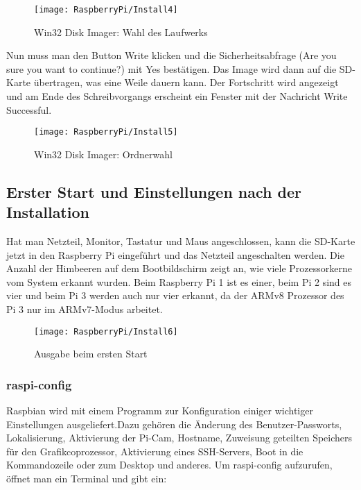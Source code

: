 \begin{figure}[!h]
	\centering
	
	\texttt{[image: RaspberryPi/Install4]}
	
	\caption{Win32 Disk Imager: Wahl des Laufwerks}
	
\end{figure}

Nun muss man den Button Write klicken und die Sicherheitsabfrage (Are you sure you want to continue?) mit Yes bestätigen. Das Image wird dann auf die SD-Karte übertragen, was eine Weile dauern kann. Der Fortschritt wird angezeigt und am Ende des Schreibvorgangs erscheint ein Fenster mit der Nachricht Write Successful.

\begin{figure}[!h]
	\centering
	
	\texttt{[image: RaspberryPi/Install5]}
	
	\caption{Win32 Disk Imager: Ordnerwahl}
	
\end{figure}

\subsection{Erster Start und Einstellungen nach der Installation}


Hat man Netzteil, Monitor, Tastatur und Maus angeschlossen, kann die SD-Karte jetzt in den Raspberry Pi eingeführt und das Netzteil angeschalten werden. Die Anzahl der Himbeeren auf dem Bootbildschirm zeigt an, wie viele Prozessorkerne vom System erkannt wurden. Beim Raspberry Pi 1 ist es einer, beim Pi 2 sind es vier und beim Pi 3 werden auch nur vier erkannt, da der ARMv8 Prozessor des Pi 3 nur im ARMv7-Modus arbeitet.

\begin{figure}[!h]
	\centering
	
	\texttt{[image: RaspberryPi/Install6]}
	
	\caption{Ausgabe beim ersten Start}
	
\end{figure}

\subsubsection{raspi-config}

Raspbian wird mit einem Programm zur Konfiguration einiger wichtiger Einstellungen ausgeliefert.Dazu gehören die Änderung des Benutzer-Passworts, Lokalisierung, Aktivierung der Pi-Cam, Hostname, Zuweisung geteilten Speichers für den Grafikcoprozessor, Aktivierung eines SSH-Servers, Boot in die Kommandozeile oder zum Desktop und anderes. Um raspi-config aufzurufen, öffnet man ein Terminal und gibt ein:


